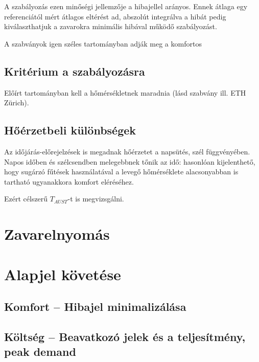 A szabályozás ezen minőségi jellemzője a hibajellel arányos. Ennek átlaga egy referenciától mért átlagos eltérést ad, abszolút integrálva a hibát pedig kiválaszthatjuk a zavarokra minimális hibával működő szabályozást.

A szabványok igen széles tartományban adják meg a komfortos 

\subsection{Kritérium a szabályozásra}
Előírt tartományban kell a hőmérsékletnek maradnia (lásd szabvány ill. ETH Zürich).

\subsection{Hőérzetbeli különbségek}
Az időjárás-előrejelzések is megadnak hőérzetet a napsütés, szél függvényében.
Napos időben és szélcsendben melegebbnek tőnik az idő: hasonlóan kijelenthető, hogy sugárzó fűtések használatával a levegő hőmérséklete alacsonyabban is tartható ugyanakkora komfort eléréséhez.

Ezért célszerű $T_{AUST}$-t is megvizsgálni.

\section{Zavarelnyomás}

\section{Alapjel követése}

\subsection{Komfort -- Hibajel minimalizálása}
\subsection{Költség -- Beavatkozó jelek és a teljesítmény, peak demand}






